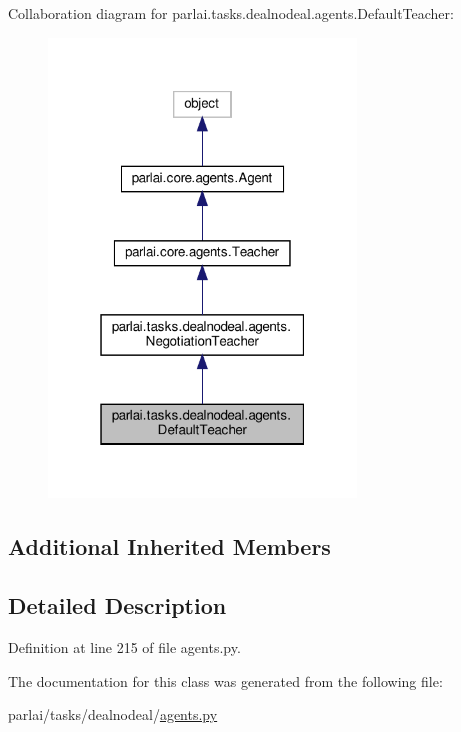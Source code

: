 Collaboration diagram for parlai.\+tasks.\+dealnodeal.\+agents.\+Default\+Teacher\+:
\nopagebreak
\begin{figure}[H]
\begin{center}
\leavevmode
\includegraphics[width=232pt]{de/d98/classparlai_1_1tasks_1_1dealnodeal_1_1agents_1_1DefaultTeacher__coll__graph}
\end{center}
\end{figure}
\subsection*{Additional Inherited Members}


\subsection{Detailed Description}


Definition at line 215 of file agents.\+py.



The documentation for this class was generated from the following file\+:\begin{DoxyCompactItemize}
\item 
parlai/tasks/dealnodeal/\hyperlink{parlai_2tasks_2dealnodeal_2agents_8py}{agents.\+py}\end{DoxyCompactItemize}
